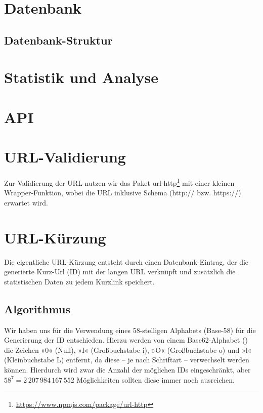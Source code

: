 \documentclass[a4paper,11pt,DIV=12,overfullrule=on]{scrreprt}
\begin{document}
\section{Datenbank}
\subsection{Datenbank-Struktur}
\section{Statistik und Analyse}
\section{API}
\section{URL-Validierung}
Zur Validierung der URL nutzen wir das Paket {\ttfamily url-http}\footnote{\href{https://www.npmjs.com/package/url-http}{https://www.npmjs.com/package/url-http}} mit einer kleinen Wrapper-Funktion, wobei die URL inklusive Schema ({\ttfamily http://} bzw. {\ttfamily https://}) erwartet wird.
\section{URL-Kürzung}
Die eigentliche URL-Kürzung entsteht durch einen Datenbank-Eintrag, der die generierte Kurz-Url (ID) mit der langen URL verknüpft und zusätzlich die statistischen Daten zu jedem Kurzlink speichert.
\subsection{Algorithmus}
Wir haben uns für die Verwendung eines 58-stelligen Alphabets (Base-58) für die Generierung der ID entschieden. Hierzu werden von einem Base62-Alphabet ({\ttfamily[0-9A-Za-z]}) die Zeichen »0« (Null), »I« (Großbuchstabe i), »O« (Großbuchstabe o) und »l« (Kleinbuchstabe L) entfernt, da diese – je nach Schriftart – verwechselt werden können. Hierdurch wird zwar die Anzahl der möglichen IDs eingeschränkt, aber $58^7 =  2\,207\,984\,167\,552$ Möglichkeiten sollten diese immer noch ausreichen.
\end{document}
